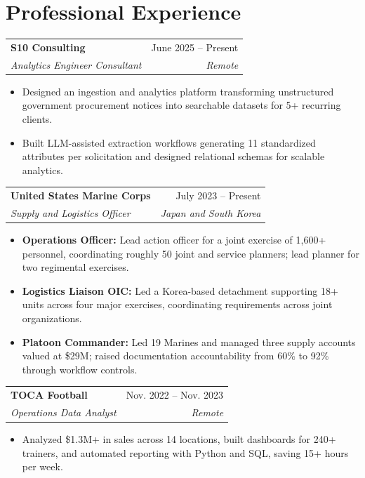 \documentclass[letterpaper,11pt]{article}
\makeatletter
\newcommand{\entry}[4]{%
  \noindent\begin{tabularx}{\textwidth}{@{}Xr@{}}%
  \textbf{#1} & \small #2 \\
  \textit{\small #3} & \textit{\small #4} \\
  \end{tabularx}\vspace{1pt}\par}
\newenvironment{details}{\begin{itemize}[leftmargin=1.25em,label=\textbullet,topsep=2pt,itemsep=0.5pt,parsep=0pt,partopsep=0pt]\small}{\end{itemize}\vspace{2pt}}
\makeatother
\begin{document}
\section{Professional Experience}
\entry{S10 Consulting}{June 2025 -- Present}{Analytics Engineer Consultant}{Remote}
\begin{details}
\item Designed an ingestion and analytics platform transforming unstructured government procurement notices into searchable datasets for 5+ recurring clients.
\item Built LLM-assisted extraction workflows generating 11 standardized attributes per solicitation and designed relational schemas for scalable analytics.
\end{details}
\entry{United States Marine Corps}{July 2023 -- Present}{Supply and Logistics Officer}{Japan and South Korea}
\begin{details}
\item \textbf{Operations Officer:} Lead action officer for a joint exercise of 1,600+ personnel, coordinating roughly 50 joint and service planners; lead planner for two regimental exercises.
\item \textbf{Logistics Liaison OIC:} Led a Korea-based detachment supporting 18+ units across four major exercises, coordinating requirements across joint organizations.
\item \textbf{Platoon Commander:} Led 19 Marines and managed three supply accounts valued at \$29M; raised documentation accountability from 60\% to 92\% through workflow controls.
\end{details}
\entry{TOCA Football}{Nov. 2022 -- Nov. 2023}{Operations Data Analyst}{Remote}
\begin{details}
\item Analyzed \$1.3M+ in sales across 14 locations, built dashboards for 240+ trainers, and automated reporting with Python and SQL, saving 15+ hours per week.
\end{details}
\end{document}
